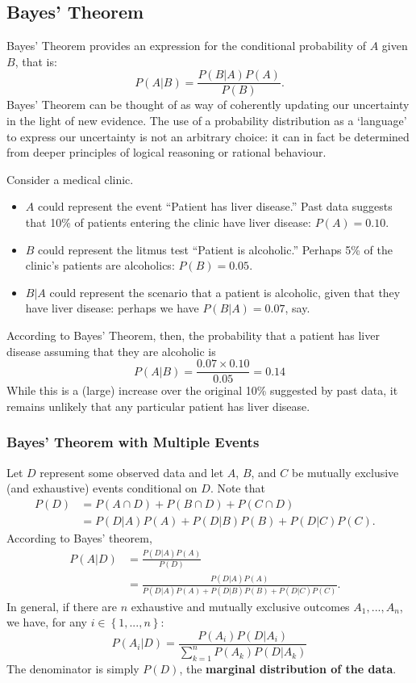 \subsection{Bayes' Theorem } %
Bayes' Theorem provides an expression for the conditional probability of $A$ given $B$, that is:
	$$P(A|B) = \frac{P(B|A) P(A)}{P(B)}.$$
Bayes' Theorem can be thought of as way of coherently updating our uncertainty in the light of new evidence. The use of a probability distribution as a `language' to express our uncertainty is not an arbitrary choice: it can in fact be determined from deeper principles of logical reasoning or rational behaviour.
\begin{Example} Consider a medical clinic.
\begin{itemize}[noitemsep]
	\item $A$  could represent the event ``Patient has liver disease.'' Past data suggests that 10\% of patients entering the clinic have liver disease: $P(A) = 0.10$.
	\item $B$  could represent the litmus test ``Patient is alcoholic.'' Perhaps 5\% of the clinic's patients are alcoholics:  $P(B) = 0.05$.
	\item $B|A$ could represent the scenario that a patient is alcoholic, given that they have liver disease: perhaps we have $P(B|A) = 0.07$, say.
\end{itemize}
 According to Bayes' Theorem, then, the probability that a patient has liver disease assuming that they are alcoholic is $$P(A|B) = \frac{0.07 \times 0.10}{0.05} = 0.14$$ 
While this is a (large) increase over the original 10\% suggested by past data, it remains unlikely that any particular patient has liver disease.
\end{Example}
\subsubsection*{Bayes' Theorem with Multiple Events}
Let $D$ represent some observed data and let $A$, $B$, and $C$ be mutually exclusive (and exhaustive) events conditional on $D$.  Note that
\begin{equation*}
\begin{aligned}
P( D )&= P( A \cap D ) + P( B \cap D )+P(C \cap D)  & \\
      &= P(D|A) P(A) + P(D|B) P(B) + P(D|C) P(C).&
\end{aligned}
\end{equation*}
According to Bayes' theorem, 
\begin{equation*}
\begin{aligned}
P( A|D )&= \frac{P(D|A) P(A)}{P(D)}  & \\
        &= \frac{P(D|A) P(A)}{P(D|A) P(A) + P(D|B) P(B) + P(D|C) P(C)}.&
\end{aligned}
\end{equation*}
In general, if there are $n$ exhaustive and mutually exclusive outcomes $A_{1},..., A_{n}$, we have, for any $i\in\left\{1,..., n\right\}$: 
$$ P(A_{i}|D) = \frac{P(A_{i}) P(D|A_{i})}{\sum^{n}_{k=1} P(A_{k}) P(D|A_{k})} $$ 
The denominator is simply $P(D)$, the \textbf{marginal distribution of the data}. 


